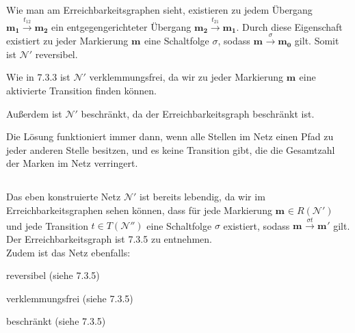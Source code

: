 \documentclass[12pt,a4paper]{../krautsourcing/homework}
\newcommand{\m}[1][]{\textbf{m}_{\textbf{#1}}}
\begin{document}
\begin{compactenum}
\item
Wie man am Erreichbarkeitsgraphen sieht, existieren zu jedem Übergang \(\m[1] \xrightarrow{t_{12}} \m[2]\) ein entgegengerichteter Übergang \(\m[2] \xrightarrow{t_{21}} \m[1]\). Durch diese Eigenschaft existiert zu jeder Markierung \(\m\) eine Schaltfolge \(\sigma\), sodass \(\m \xrightarrow{\sigma} \m[0]\) gilt. Somit ist \(\mathcal{N}'\) reversibel.
\item
Wie in 7.3.3 ist \(\mathcal{N}'\) verklemmungsfrei, da wir zu jeder Markierung \(\m\) eine aktivierte Transition finden können.
\item
Außerdem ist \(\mathcal{N}'\) beschränkt, da der Erreichbarkeitsgraph beschränkt ist.
\end{compactenum}
Die Lösung funktioniert immer dann, wenn alle Stellen im Netz einen Pfad zu jeder anderen Stelle besitzen, und es keine Transition gibt, die die Gesamtzahl der Marken im Netz verringert.

\subsection{}

Das eben konstruierte Netz \(\mathcal{N}'\) ist bereits lebendig, da wir im Erreichbarkeitsgraphen sehen können, dass für jede Markierung \(\m \in R(\mathcal{N}')\) und jede Transition \(t \in T(\mathcal{N}'')\) eine Schaltfolge \(\sigma\) existiert, sodass \(\m \xrightarrow{\sigma t} \m'\) gilt.\\
Der Erreichbarkeitsgraph ist 7.3.5 zu entnehmen.\\
Zudem ist das Netz ebenfalls:\\
\begin{compactenum}
\item reversibel (siehe 7.3.5)
\item verklemmungsfrei (siehe 7.3.5)
\item beschränkt (siehe 7.3.5)
\end{compactenum}


\section{}


\subsection{}
\end{document}
